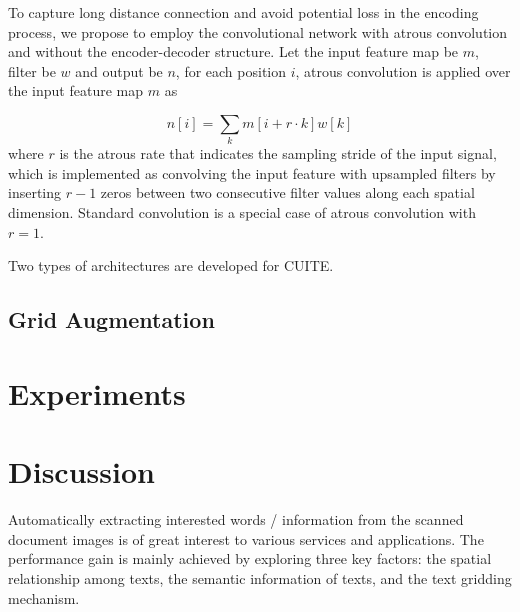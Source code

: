 \documentclass[10pt,twocolumn,letterpaper]{article}
\begin{document}
To capture long distance connection and avoid potential loss in the encoding process, we propose to employ the convolutional network with atrous convolution and without the encoder-decoder structure. Let the input feature map be $m$, filter be $w$ and output be $n$, for each position $i$, atrous convolution is applied over the input feature map $m$ as 

\begin{equation}
n[i] = \sum_k m[i+r\cdot k]w[k]
\end{equation}
where $r$ is the atrous rate that indicates the sampling stride of the input signal, which is implemented as convolving the input feature with upsampled filters by inserting $r-1$ zeros between two consecutive filter values along each spatial dimension. Standard convolution is a special case of atrous convolution with $r=1$.

Two types of architectures are developed for CUITE. 

\subsection{Grid Augmentation}
\label{gridaugmentation}

\section{Experiments}


\section{Discussion}
Automatically extracting interested words / information from the scanned document images is of great interest to various services and applications. The performance gain is mainly achieved by exploring three key factors: the spatial relationship among texts, the semantic information of texts, and the text gridding mechanism.

{\small


}
\end{document}
